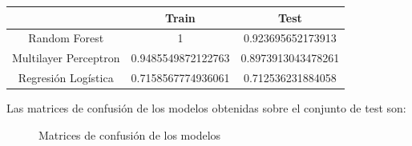 \documentclass[a4]{article}
\begin{document}
\begin{center}
\begin{tabular}{|c|c|c|}
  \hline
  \multicolumn{1}{|c|}{}& \textbf{Train} & \textbf{Test}  \\ \hline
  Random Forest         & 1                  & 0.923695652173913 \\
  Multilayer Perceptron & 0.9485549872122763 & 0.8973913043478261 \\
  Regresión Logística   & 0.7158567774936061 & 0.712536231884058 \\\hline
\end{tabular}
\end{center}

Las matrices de confusión de los modelos obtenidas sobre el conjunto de test son:

\begin{figure}[H]
  \centering
  \caption{Matrices de confusión de los modelos}
  \label{fig:Confussion Matrix}
\end{figure}
\end{document}
